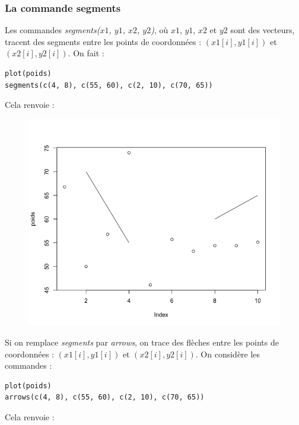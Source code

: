 \subsubsection{La commande segments}
Les commandes \textit{segments($x1$, $y1$, $x2$, $y2$)}, où $x1$, $y1$, $x2$ et $y2$ sont des vecteurs, tracent des segments entre les points de coordonnées : $(x1[i], y1[i])$ et $(x2[i], y2[i])$.\newline
On fait :
\begin{lstlisting}[language=html]
plot(poids)
segments(c(4, 8), c(55, 60), c(2, 10), c(70, 65))
\end{lstlisting}
Cela renvoie :
\begin{figure}[H]\begin{center}\includegraphics[scale=0.4]{ilu/gra62.png}\end{center}\end{figure}
Si on remplace \textit{segments} par \textit{arrows}, on trace des flèches entre les points de coordonnées : $(x1[i], y1[i])$ et $(x2[i], y2[i])$.
On considère les commandes :
\begin{lstlisting}[language=html]
plot(poids)
arrows(c(4, 8), c(55, 60), c(2, 10), c(70, 65))
\end{lstlisting}
Cela renvoie :
